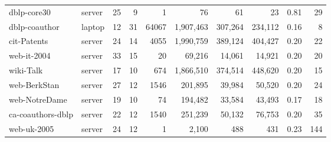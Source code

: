 \begin{tabular}{@{}llrrrrrrrr@{}}
dblp-core30 & server & 25 & 9 & 1 & 76 & 61 & 23 & 0.81 & 29 \\
dblp-coauthor & laptop & 12 & 31 & 64067 & 1,907,463 & 307,264 & 234,112 & 0.16 & 8 \\
cit-Patents & server & 24 & 14 & 4055 & 1,990,759 & 389,124 & 404,427 & 0.20 & 22 \\
web-it-2004 & server & 33 & 15 & 20 & 69,216 & 14,061 & 14,921 & 0.20 & 20 \\
wiki-Talk & server & 17 & 10 & 674 & 1,866,510 & 374,514 & 448,620 & 0.20 & 15 \\
web-BerkStan & server & 27 & 12 & 1546 & 201,895 & 39,984 & 50,520 & 0.20 & 24 \\
web-NotreDame & server & 19 & 10 & 74 & 194,482 & 33,584 & 43,493 & 0.17 & 18 \\
ca-coauthors-dblp & server & 22 & 12 & 1540 & 251,239 & 50,132 & 76,753 & 0.20 & 35 \\
web-uk-2005 & server & 24 & 12 & 1 & 2,100 & 488 & 431 & 0.23 & 144 \\
\bottomrule
\end{tabular}

